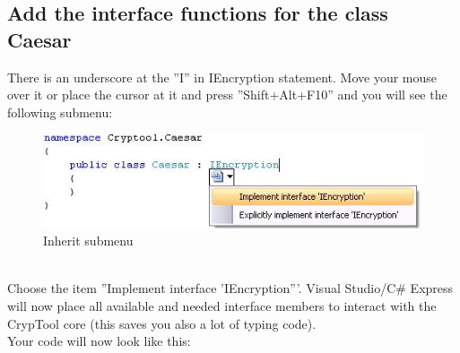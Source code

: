 \subsection{Add the interface functions for the class Caesar}\label{sec:AddTheInterfaceFunctionsForTheClassCaesar}
There is an underscore at the ''I'' in IEncryption statement. Move your mouse over it or place the cursor at it and press ''Shift+Alt+F10'' and you will see the following submenu:
\begin{figure}[h!]
	\centering
		\includegraphics{figures/inherit_submenu.jpg}
	\caption{Inherit submenu}
	\label{fig:inherit_submenu}
\end{figure}\\
Choose the item ''Implement interface 'IEncryption'''. Visual Studio/C\# Express will now place all available and needed interface members to interact with the CrypTool core (this saves you also a lot of typing code).\\
Your code will now look like this:
